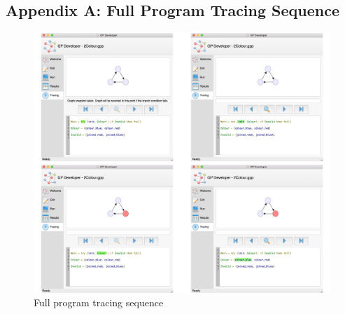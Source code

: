\documentclass[authoryearcitations]{UoYCSproject}
\newenvironment{nscenter}
    {\parskip=0pt\par\nopagebreak\centering}
    {\par\noindent\ignorespacesafterend}
\begin{document}
\clearpage




\clearpage


\begin{appendices}

\chapter{Appendix A: Full Program Tracing Sequence}
\label{cha:AppA}

\begin{figure}[!htb]
    \begin{nscenter}
        \includegraphics[width=\textwidth]{SeqCollage1}
    \end{nscenter}
    \caption{Full program tracing sequence}
    \label{fig:TracingSequence}
\end{figure}


\end{appendices}
\end{document}
